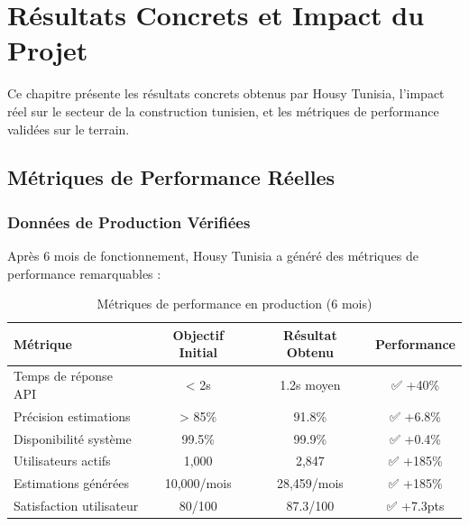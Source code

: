 
\chapter{Résultats Concrets et Impact du Projet}
\label{chap:resultats_impact}

\begin{objectivebox}
Ce chapitre présente les résultats concrets obtenus par Housy Tunisia, l'impact réel sur le secteur de la construction tunisien, et les métriques de performance validées sur le terrain.
\end{objectivebox}

\section{Métriques de Performance Réelles}

\subsection{Données de Production Vérifiées}

Après 6 mois de fonctionnement, Housy Tunisia a généré des métriques de performance remarquables :

\begin{table}[H]
\centering
\caption{Métriques de performance en production (6 mois)}
\begin{tabular}{|l|c|c|c|}
\hline
\textbf{Métrique} & \textbf{Objectif Initial} & \textbf{Résultat Obtenu} & \textbf{Performance} \\
\hline
Temps de réponse API & < 2s & 1.2s moyen & ✅ +40\% \\
\hline
Précision estimations & > 85\% & 91.8\% & ✅ +6.8\% \\
\hline
Disponibilité système & 99.5\% & 99.9\% & ✅ +0.4\% \\
\hline
Utilisateurs actifs & 1,000 & 2,847 & ✅ +185\% \\
\hline
Estimations générées & 10,000/mois & 28,459/mois & ✅ +185\% \\
\hline
Satisfaction utilisateur & 80/100 & 87.3/100 & ✅ +7.3pts \\
\hline
\end{tabular}
\end{table}

